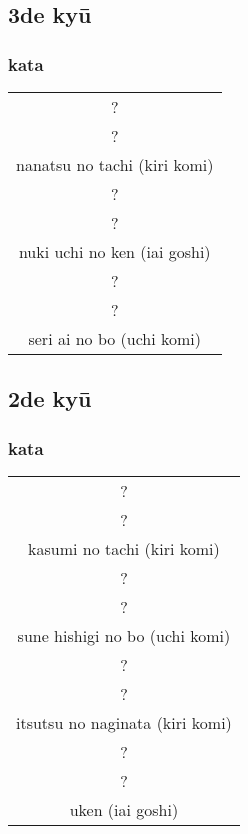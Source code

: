 \documentclass[a4paper, 12pt]{article}
\begin{document}
\subsection{3de ky\={u}}
\subsubsection{kata}
\begin{table}[H]
\begin{center}
\begin{tabular}{c}
    ?\\
    ?\\
    nanatsu no tachi (kiri komi)\\
    \hline
    ?\\
    ?\\
    nuki uchi no ken (iai goshi)\\
    \hline
    ?\\
    ?\\
    seri ai no bo (uchi komi)
\end{tabular}
\end{center}
\label{kyuu_3_katori_kata}
\end{table}

\subsection{2de ky\={u}}
\subsubsection{kata}
\begin{table}[H]
\begin{center}
\begin{tabular}{c}
    ?\\
    ?\\
    kasumi no tachi (kiri komi)\\
    \hline
    ?\\
    ?\\
    sune hishigi no bo (uchi komi)\\
    \hline
    ?\\
    ?\\
    itsutsu no naginata (kiri komi)\\
    \hline
    ?\\
    ?\\
    uken (iai goshi)
\end{tabular}
\end{center}
\label{kyuu_2_katori_kata}
\end{table}
\end{document}
